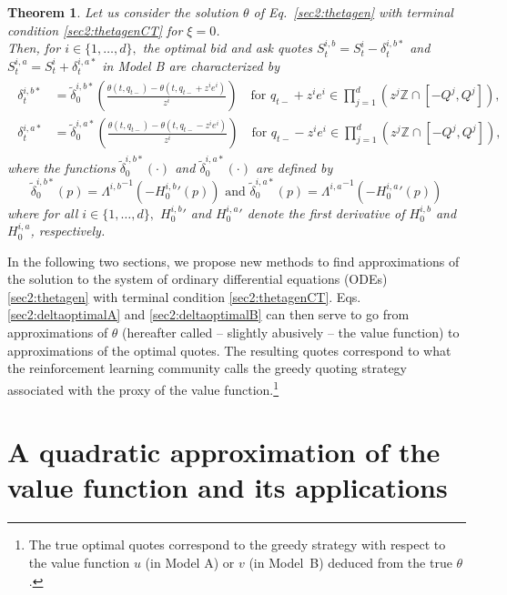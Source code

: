 \documentclass[preprint, 3p]{elsarticle}
\newcommand{\1}{{\chi}}
\newtheorem{theorem}{Theorem}
\begin{document}
\begin{theorem}
\label{optquotesbis}
	Let us consider the solution $\theta$ of Eq.~\eqref{sec2:thetagen} with terminal condition \eqref{sec2:thetagenCT} for $\xi=0$.\\
	
	Then, for $i \in \{1, \ldots, d\},$ the optimal bid and ask quotes $S^{i,b}_t = S^i_t - \delta^{i,b*}_t$ and $S^{i,a}_t = S^i_t + \delta^{i,a*}_t$ in  Model B are characterized by\begin{align}
		\begin{split}
	\label{sec2:deltaoptimalB}
	\delta^{i,b*}_t &= \tilde{\delta}^{i,b*}_0\left(\frac{\theta(t,q_{t-}) - \theta(t,q_{t-}+z^i e^i)}{z^i}\right) \quad \text{for } q_{t-}+z^i e^i \in \prod_{j=1}^d \left(z^j \mathbb Z \cap [-Q^j, Q^j]\right), \\
	 \delta^{i,a*}_t &= \tilde{\delta}^{i,a*}_0\left(\frac{\theta(t,q_{t-}) - \theta(t,q_{t-}-z^i e^i)}{z^i}\right) \quad \text{for } q_{t-}-z^i e^i \in \prod_{j=1}^d \left(z^j \mathbb Z \cap [-Q^j, Q^j]\right),
	 \end{split}
	\end{align}where the functions $\tilde{\delta}^{i,b*}_0(\cdot)$ and $\tilde{\delta}_0^{i,a*}(\cdot)$ are defined by
	$$\tilde{\delta}^{i,b*}_0(p) = {\Lambda^{i,b}}^{-1}\left(- {H_{0}^{i,b}}'(p)\right) \text{ and } \tilde{\delta}^{i,a*}_0(p) = {\Lambda^{i,a}}^{-1}\left(- {H_{0}^{i,a}}'(p)\right)$$
where for all $i \in \{1, \ldots, d\},$ ${H_{0}^{i,b}}'$ and ${H_{0}^{i,a}}'$ denote the first derivative of ${H_{0}^{i,b}}$ and ${H_{0}^{i,a}}$, respectively.
\end{theorem}

\noindent
In the following two sections, we propose new methods to find approximations of the solution to the system of ordinary differential equations (ODEs) \eqref{sec2:thetagen} with terminal condition \eqref{sec2:thetagenCT}. Eqs. \eqref{sec2:deltaoptimalA} and \eqref{sec2:deltaoptimalB} can then serve to go from approximations of $\theta$ (hereafter called -- slightly abusively -- the value function) to approximations of the optimal quotes. The resulting quotes correspond to what the reinforcement learning community calls  the greedy quoting strategy associated with the proxy of the value function.\footnote{The true optimal quotes correspond to the greedy strategy with respect to the value function $u$ (in Model A) or $v$ (in Model~B) deduced from the true $\theta$.}

\section{A quadratic approximation of the value function and its applications} \label{sec:generaleq}
\end{document}
